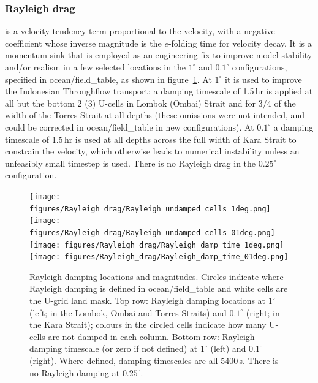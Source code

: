 \documentclass[11pt, a4paper]{article}
\newcommand{\paramsty}[1]{\textsf{#1}}
\newcommand{\param}[1]{\paramsty{#1}\index{\paramsty{#1}}}
\begin{document}
\subsubsection{Rayleigh drag}\label{S:Rayleigh}
 is a velocity tendency term proportional to the velocity, with a negative coefficient whose inverse magnitude is the $e$-folding time for velocity decay.
It is a momentum sink that is employed as an engineering fix to improve model stability and/or realism in a few selected locations in the $1^\circ$ and $0.1^\circ$ configurations, specified in \paramsty{ocean/}\param{field_table}, as shown in figure~\ref{F:Rayleigh}.
At $1^\circ$ it is used to improve the Indonesian Throughflow transport; a damping timescale of 1.5\,hr is applied at all but the bottom 2 (3) U-cells in Lombok (Ombai) Strait and for 3/4 of the width of the Torres Strait at all depths (these omissions were not intended, and could be corrected in \paramsty{ocean/}\param{field_table} in new configurations).
At $0.1^\circ$ a damping timescale of 1.5\,hr is used at all depths across the full width of Kara Strait to constrain the velocity, which otherwise leads to numerical instability unless an unfeasibly small timestep is used.
There is no Rayleigh drag in the $0.25^\circ$ configuration.

\begin{figure}
\begin{center}
\texttt{[image: figures/Rayleigh\_drag/Rayleigh\_undamped\_cells\_1deg.png]}\quad
\texttt{[image: figures/Rayleigh\_drag/Rayleigh\_undamped\_cells\_01deg.png]}\\
\texttt{[image: figures/Rayleigh\_drag/Rayleigh\_damp\_time\_1deg.png]}\quad
\texttt{[image: figures/Rayleigh\_drag/Rayleigh\_damp\_time\_01deg.png]}
\end{center}
\caption[Rayleigh damping locations and magnitudes.]{
Rayleigh damping locations and magnitudes.
Circles indicate where Rayleigh damping is defined in \paramsty{ocean/}\param{field_table} and white cells are the U-grid land mask.
Top row: Rayleigh damping locations at $1^\circ$ (left; in the Lombok, Ombai and Torres Straits) and $0.1^\circ$ (right; in the Kara Strait); colours in the circled cells indicate how many U-cells are not damped in each column.
Bottom row: Rayleigh damping timescale (or zero if not defined) at $1^\circ$ (left) and $0.1^\circ$ (right). 
Where defined, damping timescales are all 5400\,s. 
There is no Rayleigh damping at $0.25^\circ$.
\label{F:Rayleigh}
}
\end{figure}
\end{document}
